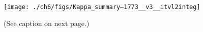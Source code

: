
  \begin{figure}
    \centering
    \noindent\texttt{[image: ./ch6/figs/Kappa\_summary--1773\_\_v3\_\_itvl2integ]}
    \caption[Inverted V precipitation and best-fit Maxwellian and kappa
    distribution parameters (Orbit 1773)]{(See caption on next page.)}
    \label{ch6:Fig1}
  \end{figure}
